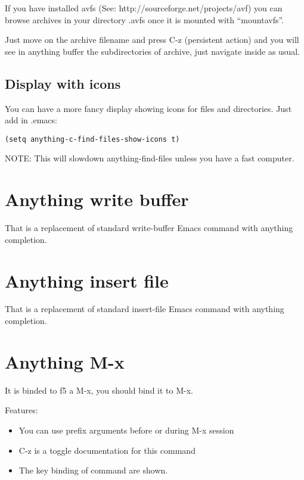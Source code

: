 \documentclass[a4paper,11pt]{article}
\begin{document}
If you have installed avfs (See: http://sourceforge.net/projects/avf) you can browse archives
in your directory .avfs once it is mounted with ``mountavfs''.

Just move on the archive filename and press C-z (persistent action) and you will see
in anything buffer the subdirectories of archive, just navigate inside as usual.

\subsection{Display with icons}
\label{sec:display-with-icons}

You can have a more fancy display showing icons for files and directories.
Just add in .emacs:
\begin{verbatim}
(setq anything-c-find-files-show-icons t)
\end{verbatim}
NOTE: This will slowdown anything-find-files unless you have a fast computer.

\section{Anything write buffer}
\label{sec:anyth-write-buff}
That is a replacement of standard write-buffer Emacs command with anything completion.
\section{Anything insert file}
\label{sec:anything-insert-file}
That is a replacement of standard insert-file Emacs command with anything completion.

\section{Anything M-x}
\label{sec:anything-m-x}
It is binded to f5 a M-x, you should bind it to M-x.

Features:\\
\begin{itemize}
\item You can use prefix arguments before or during M-x session
\end{itemize}
\begin{itemize}
\item C-z is a toggle documentation for this command
\end{itemize}
\begin{itemize}
\item The key binding of command are shown.
\end{itemize}
\end{document}
